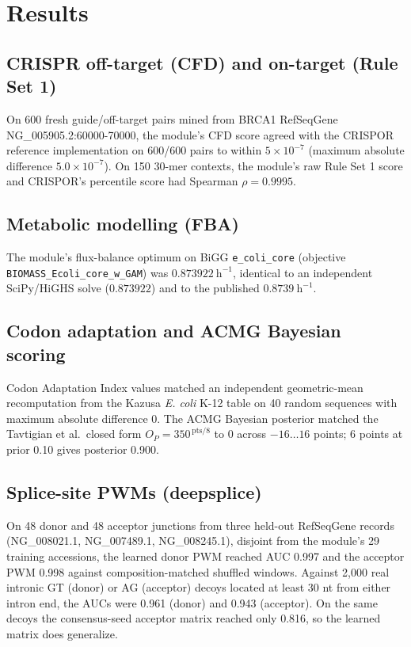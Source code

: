 \documentclass[11pt]{article}
\begin{document}
\section{Results}
\subsection{CRISPR off-target (CFD) and on-target (Rule Set 1)}
On 600 fresh guide/off-target pairs mined from BRCA1 RefSeqGene
NG\_005905.2:60000-70000, the module's CFD score agreed with the CRISPOR
reference implementation on 600/600 pairs to within $5\times10^{-7}$ (maximum
absolute difference $5.0\times10^{-7}$). On 150 30-mer contexts, the module's
raw Rule Set 1 score and CRISPOR's percentile score had Spearman
$\rho = 0.9995$.

\subsection{Metabolic modelling (FBA)}
The module's flux-balance optimum on BiGG \texttt{e\_coli\_core}
(objective \texttt{BIOMASS\_Ecoli\_core\_w\_GAM}) was $0.873922\ \mathrm{h^{-1}}$,
identical to an independent SciPy/HiGHS solve ($0.873922$) and to the published
$0.8739\ \mathrm{h^{-1}}$.

\subsection{Codon adaptation and ACMG Bayesian scoring}
Codon Adaptation Index values matched an independent geometric-mean
recomputation from the Kazusa \emph{E. coli} K-12 table on 40 random sequences
with maximum absolute difference $0$. The ACMG Bayesian posterior matched the
Tavtigian et al.\ closed form $O_P = 350^{\,\mathrm{pts}/8}$ to $0$ across
$-16\ldots16$ points; 6 points at prior 0.10 gives posterior 0.900.

\subsection{Splice-site PWMs (deepsplice)}
On 48 donor and 48 acceptor junctions from three held-out RefSeqGene records
(NG\_008021.1, NG\_007489.1, NG\_008245.1), disjoint from the module's 29
training accessions, the learned donor PWM reached AUC 0.997 and the acceptor
PWM 0.998 against composition-matched shuffled windows. Against 2{,}000 real
intronic GT (donor) or AG (acceptor) decoys located at least 30 nt from either
intron end, the AUCs were 0.961 (donor) and 0.943 (acceptor). On the same
decoys the consensus-seed acceptor matrix reached only 0.816, so the learned
matrix does generalize.
\end{document}
